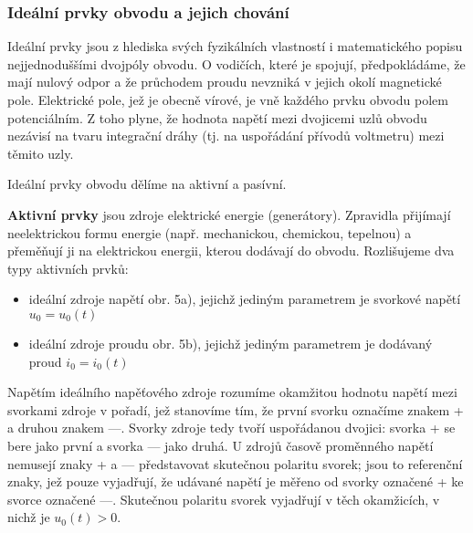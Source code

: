 {      \subsubsection{Ideální prvky obvodu a jejich chování}
        Ideální prvky jsou z hlediska svých fyzikálních vlastností i matematického popisu 
        nejjednoduššími dvojpóly obvodu. O vodičích, které je spojují, předpokládáme, že mají 
        nulový odpor a že průchodem proudu nevzniká v jejich okolí magnetické pole. Elektrické 
        pole, jež je obecně vírové, je vně každého prvku obvodu polem potenciálním. Z toho plyne, 
        že hodnota napětí mezi dvojicemi uzlů obvodu nezávisí na tvaru integrační dráhy (tj. na 
        uspořádání přívodů voltmetru) mezi těmito uzly.
        
        Ideální prvky obvodu dělíme na aktivní a pasívní.
        
        \textbf{Aktivní prvky} jsou zdroje elektrické energie (generátory). Zpravidla přijímají 
        neelektrickou formu energie (např. mechanickou, chemickou, tepelnou) a přeměňují ji na 
        elektrickou energii, kterou dodávají do obvodu. Rozlišujeme dva typy aktivních prvků:
        \begin{itemize}
          \item ideální zdroje napětí obr. 5a), jejichž jediným parametrem je svorkové napětí     
                \(u_0 =  u_0(t)\)
          \item ideální zdroje proudu obr. 5b), jejichž jediným parametrem je dodávaný proud      
                \(i_0 = i_0(t)\)
        \end{itemize}
        
        Napětím ideálního napěťového zdroje rozumíme okamžitou hodnotu napětí mezi svorkami zdroje 
        v pořadí, jež stanovíme tím, že první svorku označíme znakem + a druhou znakem —. Svorky 
        zdroje tedy tvoří uspořádanou dvojici: svorka + se bere jako první a svorka — jako druhá. U 
        zdrojů časově proměnného napětí nemusejí znaky + a — představovat skutečnou polaritu 
        svorek; jsou to referenční znaky, jež pouze vyjadřují, že udávané napětí je měřeno od 
        svorky označené + ke svorce označené —. Skutečnou polaritu svorek vyjadřují v těch 
        okamžicích, v nichž je \(u_0(t) > 0\).
        
}
